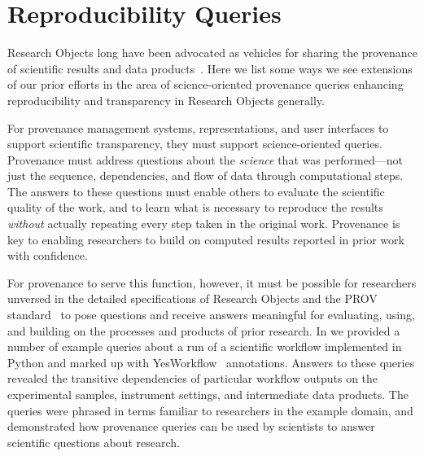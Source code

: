 \section{Reproducibility Queries}\label{sec-transparency}

Research Objects long have been advocated as vehicles for sharing the
	provenance of scientific results and data products~\cite{bechhofer2013whya}.
Here we list some ways we see extensions of our prior efforts in the area
	of science-oriented provenance queries
    enhancing reproducibility and transparency in
	Research Objects generally.

For provenance management systems, representations, and user interfaces to support
	scientific transparency, they must support science-oriented queries.
Provenance must address questions about the \emph{science} that was performed---not just the
	sequence, dependencies, and flow of data through computational steps.
The answers to these questions must enable others to evaluate the scientific quality of the work,
	and to learn what is necessary to
	reproduce the results \emph{without} actually repeating every step taken in the original work.
Provenance is key to enabling researchers to build on computed results reported in prior work with confidence.

For provenance to serve this function, however, it must be possible for researchers unversed in the detailed
	specifications of Research Objects and the PROV standard~\cite{groth2013provoverviewa} to pose
	questions and receive answers meaningful for evaluating, using, and building on the
	processes and products of prior research.
In \cite{mcphillips2015retrospective} we provided a number of example queries about a run of a scientific
	workflow implemented in Python and marked up with YesWorkflow~\cite{mcphillips2015yesworkflowa} annotations.
Answers to these queries revealed the transitive dependencies of particular workflow outputs
	on the experimental samples, instrument settings, and intermediate data products.
The queries were phrased in terms familiar to researchers in the example domain,
	and demonstrated how provenance queries can be used by scientists
	to answer scientific questions about research.

